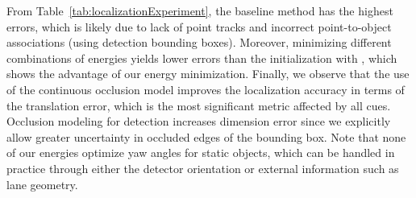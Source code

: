 From Table~\ref{tab:localizationExperiment}, the baseline method has the highest errors, which is likely due to lack of point tracks and incorrect point-to-object associations (using detection bounding boxes). Moreover, minimizing different combinations of energies yields lower errors than the initialization with \cite{Song_Chandraker_2014}, which shows the advantage of our energy minimization. Finally, we observe that the use of the continuous occlusion model improves the localization accuracy in terms of the translation error, which is the most significant metric affected by all cues. Occlusion modeling for detection increases dimension error since we explicitly allow greater uncertainty in occluded edges of the bounding box. Note that none of our energies optimize yaw angles for static objects, which can be handled in practice through either the detector orientation or external information such as lane geometry.






